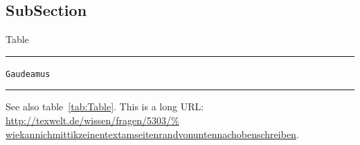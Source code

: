 \subsection{SubSection}
\lipsum[1]
\begin{table}[h]
\caption{Table} \label{tab:Table}
\hrule
\begin{description}
\item [\normalfont\texttt{Gaudeamus}] \gaudeamus
\end{description}
\hrule
\end{table}
\lipsum[1]
See also table~\ref{tab:Table}.
This is a long URL: \url{http://texwelt.de/wissen/fragen/5303/%
wiekannichmittikzeinentextamseitenrandvonuntennachobenschreiben}.
\lipsum[1]

